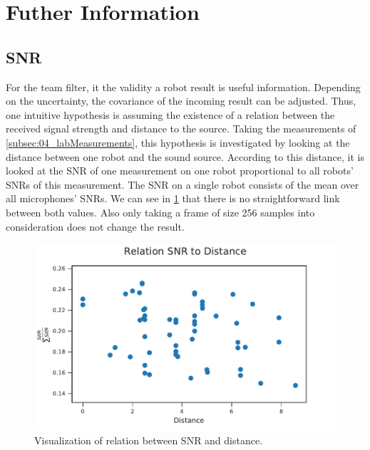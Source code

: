 \section{Futher Information}
\label{sec:04_furtherInformation}

\subsection{SNR}
\label{subsec:04_snr}

For the team filter, it the validity a robot result is useful information.
Depending on the uncertainty, the covariance of the incoming result can be adjusted.
Thus, one intuitive hypothesis is assuming the existence of a relation between the
received signal strength and distance to the source.
Taking the measurements of \ref{subsec:04_labMeasurements}, this hypothesis is
investigated by looking at the distance between one robot and the sound source.
According to this distance, it is looked at the \ac{SNR} of one measurement on
one robot proportional to all robots' \acp{SNR} of this measurement.
The \ac{SNR} on a single robot consists of the mean over all microphones' \acp{SNR}.
We can see in \cref{fig:04_snrDistance} that there is no straightforward
link between both values.
Also only taking a frame of size 256 samples into consideration
does not change the result.
\begin{figure}[ht]
	\centering
	\includegraphics[]{figures/evaluation/snr_scatter}
	\caption{Visualization of relation between SNR and distance.}
	\label{fig:04_snrDistance}
\end{figure}


